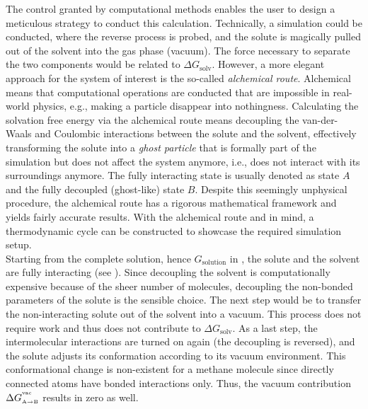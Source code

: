 \documentclass[9pt,tutorial]{livecoms}
\begin{document}
The control granted by computational methods enables the user to design a meticulous strategy to conduct this calculation. Technically, a simulation could be conducted, where the reverse process is probed, and the solute is magically pulled out of the solvent into the gas phase (vacuum). The force necessary to separate the two components would be related to $\Delta G_\text{solv}$. However, a more elegant approach for the system of interest is the so-called \textit{alchemical route}. Alchemical means that computational operations are conducted that are impossible in real-world physics, e.g., making a particle disappear into nothingness. Calculating the solvation free energy via the alchemical route means decoupling the van-der-Waals and Coulombic interactions between the solute and the solvent, effectively transforming the solute into a \textit{ghost particle} that is formally part of the simulation but does not affect the system anymore, i.e., does not interact with its surroundings anymore. The fully interacting state is usually denoted as state $A$ and the fully decoupled (ghost-like) state $B$. Despite this seemingly unphysical procedure, the alchemical route has a rigorous mathematical framework and yields fairly accurate results.\cite{Kirkwood_1935,Zwanzig_1954} With the alchemical route and  in mind, a thermodynamic cycle can be constructed to showcase the required simulation setup.\\
Starting from the complete solution, hence $G_\text{solution}$ in , the solute and the solvent are fully interacting (see ). Since decoupling the solvent is computationally expensive because of the sheer number of molecules, decoupling the non-bonded parameters of the solute is the sensible choice. The next step would be to transfer the non-interacting solute out of the solvent into a vacuum. This process does not require work and thus does not contribute to $\Delta G_\text{solv}$. As a last step, the intermolecular interactions are turned on again (the decoupling is reversed), and the solute adjusts its conformation according to its vacuum environment. This conformational change is non-existent for a methane molecule since directly connected atoms have bonded interactions only. Thus, the vacuum contribution $\Delta G_\text{\tiny A$\to$B}^{^\text{vac}}$ results in zero as well.
\end{document}

